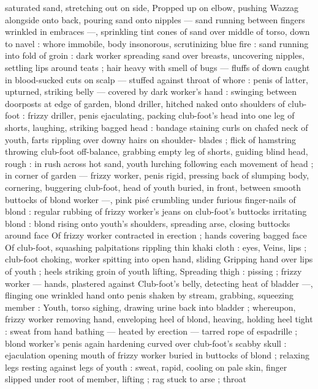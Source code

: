 saturated sand, stretching out on side, Propped up on elbow, 
pushing Wazzag alongside onto back, pouring sand onto nipples --- 
sand running between fingers wrinkled in embraces ---, sprinkling 
tint cones of sand over middle of torso, down to navel : whore 
immobile, body insonorous, scrutinizing blue fire : sand running into 
fold of groin : dark worker spreading sand over breasts, uncovering 
nipples, settling lips around teats ; hair heavy with smell of bugs --- 
fluffs of down caught in blood-sucked cuts on scalp --- stuffed 
against throat of whore : penis of latter, upturned, striking belly --- 
covered by dark worker's hand : swinging between doorposts at edge 
of garden, blond driller, hitched naked onto shoulders of club-foot : 
frizzy driller, penis ejaculating, packing club-foot's head into one leg 
of shorts, laughing, striking bagged head : bandage staining curls on 
chafed neck of youth, farts rippling over downy hairs on shoulder- 
blades ; flick of hamstring throwing club-foot off-balance, grabbing 
empty leg of shorts, guiding blind head, rough : in rush across hot 
sand, youth lurching following each movement of head ; in corner of 
garden --- frizzy worker, penis rigid, pressing back of slumping 
body, cornering, buggering club-foot, head of youth buried, in front, 
between smooth buttocks of blond worker ---, pink pisé crumbling 
under furious finger-nails of blond : regular rubbing of frizzy 
worker's jeans on club-foot's buttocks irritating blond : blond rising 
onto youth's shoulders, spreading arse, closing buttocks around face 
Of frizzy worker contracted in erection ; hands covering bagged face 
Of club-foot, squashing palpitations rippling thin khaki cloth : eyes, 
Veins, lips ; club-foot choking, worker spitting into open hand, sliding 
Gripping hand over lips of youth ; heels striking groin of youth lifting, 
Spreading thigh : pissing ; frizzy worker --- hands, plastered against 
Club-foot's belly, detecting heat of bladder ---, flinging one wrinkled 
hand onto penis shaken by stream, grabbing, squeezing member : 
Youth, torso sighing, drawing urine back into bladder ; whereupon, 
frizzy worker removing hand, enveloping heel of blond, heaving, 
holding heel tight : sweat from hand bathing --- heated by erection 
--- tarred rope of espadrille ; blond worker's penis again hardening 
curved over club-foot's scabby skull : ejaculation opening mouth of 
frizzy worker buried in buttocks of blond ; relaxing legs resting 
against legs of youth : sweat, rapid, cooling on pale skin, finger 
slipped under root of member, lifting ; rag stuck to arse ; throat 
